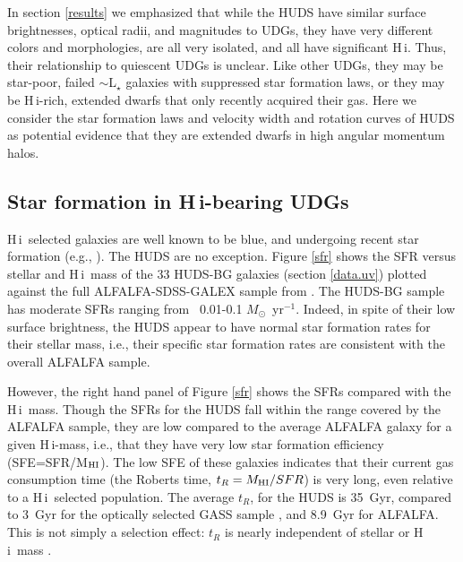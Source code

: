 \documentclass[twocolumn]{aastex6}
\newcommand{\msun}{M_{\odot}}
\def\msun{$M_\odot$}
\newcommand{\hi}{H{\sc\,i}}
\begin{document}
In section \ref{results} we emphasized that while the HUDS have similar surface brightnesses, optical radii, and magnitudes to UDGs, they have very different colors and morphologies, are all very isolated, and all have significant \hi. Thus, their relationship to quiescent UDGs is unclear. Like other UDGs, they may be star-poor, failed $\sim$L$_{\star}$ galaxies with suppressed star formation laws, or they may be \hi-rich, extended dwarfs that only recently acquired their gas. Here we consider the star formation laws and velocity width and rotation curves of HUDS as potential evidence that they are extended dwarfs in high angular momentum halos.   


\subsection{Star formation in \hi-bearing UDGs}
\label{discussion.sf}

\hi\ selected galaxies are well known to be blue, and undergoing recent star formation (e.g., \citealp{huang12b}). The HUDS are no exception. %
Figure \ref{sfr} shows the SFR versus stellar and \hi\ mass of the 33 HUDS-BG galaxies (section \ref{data.uv}) plotted against the full ALFALFA-SDSS-GALEX  sample from \cite{huang12b}. The HUDS-BG sample has moderate SFRs ranging from ~0.01-0.1 \msun~yr$^{-1}$. Indeed, in spite of their low surface brightness, the HUDS appear to have normal star formation rates for their stellar mass, i.e., their specific star formation rates are consistent with the overall ALFALFA sample. 

However, the right hand panel of Figure \ref{sfr} shows the SFRs compared with the \hi\ mass. Though the SFRs for the HUDS fall within the range covered by the ALFALFA sample, they are low compared to the average ALFALFA galaxy for a given \hi-mass, i.e., that they have very low star formation efficiency (SFE=SFR/M$_{\rm HI}$). The low SFE of these galaxies indicates that their current gas consumption time (the Roberts time, $t_R=M_{\rm HI}/SFR$) is very long, even relative to a \hi\ selected population. The average $t_R$, for the HUDS is 35~Gyr, compared to 3~Gyr for the optically selected GASS sample \citep{schiminovich10a}, and 8.9~Gyr for ALFALFA. This is not simply a selection effect: $t_R$ is nearly independent of stellar or \hi\ mass \citep{huang12b}.
\end{document}
